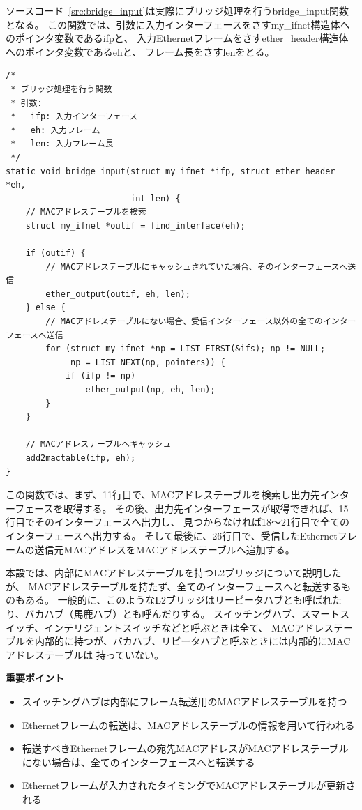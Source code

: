 ソースコード~\ref{src:bridge_input}は実際にブリッジ処理を行うbridge\_input関数となる。
この関数では、引数に入力インターフェースをさすmy\_ifnet構造体へのポインタ変数であるifpと、
入力Ethernetフレームをさすether\_header構造体へのポインタ変数であるehと、
フレーム長をさすlenをとる。
\begin{lstlisting}[caption=bridge\_input関数,label=src:bridge_input]
/*
 * ブリッジ処理を行う関数
 * 引数:
 *   ifp: 入力インターフェース
 *   eh: 入力フレーム
 *   len: 入力フレーム長
 */
static void bridge_input(struct my_ifnet *ifp, struct ether_header *eh,
                         int len) {
    // MACアドレステーブルを検索
    struct my_ifnet *outif = find_interface(eh);

    if (outif) {
        // MACアドレステーブルにキャッシュされていた場合、そのインターフェースへ送信
        ether_output(outif, eh, len);
    } else {
        // MACアドレステーブルにない場合、受信インターフェース以外の全てのインターフェースへ送信
        for (struct my_ifnet *np = LIST_FIRST(&ifs); np != NULL;
             np = LIST_NEXT(np, pointers)) {
            if (ifp != np)
                ether_output(np, eh, len);
        }
    }

    // MACアドレステーブルへキャッシュ
    add2mactable(ifp, eh);
}
\end{lstlisting}
この関数では、まず、11行目で、MACアドレステーブルを検索し出力先インターフェースを取得する。
その後、出力先インターフェースが取得できれば、15行目でそのインターフェースへ出力し、
見つからなければ18〜21行目で全てのインターフェースへ出力する。
そして最後に、26行目で、受信したEthernetフレームの送信元MACアドレスをMACアドレステーブルへ追加する。

本設では、内部にMACアドレステーブルを持つL2ブリッジについて説明したが、
MACアドレステーブルを持たず、全てのインターフェースへと転送するものもある。
一般的に、このようなL2ブリッジはリーピータハブとも呼ばれたり、バカハブ（馬鹿ハブ）とも呼んだりする。
スイッチングハブ、スマートスイッチ、インテリジェントスイッチなどと呼ぶときは全て、
MACアドレステーブルを内部的に持つが、バカハブ、リピータハブと呼ぶときには内部的にMACアドレステーブルは
持っていない。

\begin{itembox}[l]{\bf 重要ポイント}
    \begin{itemize}
        \item スイッチングハブは内部にフレーム転送用のMACアドレステーブルを持つ
        \item Ethernetフレームの転送は、MACアドレステーブルの情報を用いて行われる　
        \item 転送すべきEthernetフレームの宛先MACアドレスがMACアドレステーブルにない場合は、全てのインターフェースへと転送する
        \item Ethernetフレームが入力されたタイミングでMACアドレステーブルが更新される
    \end{itemize}
\end{itembox}

